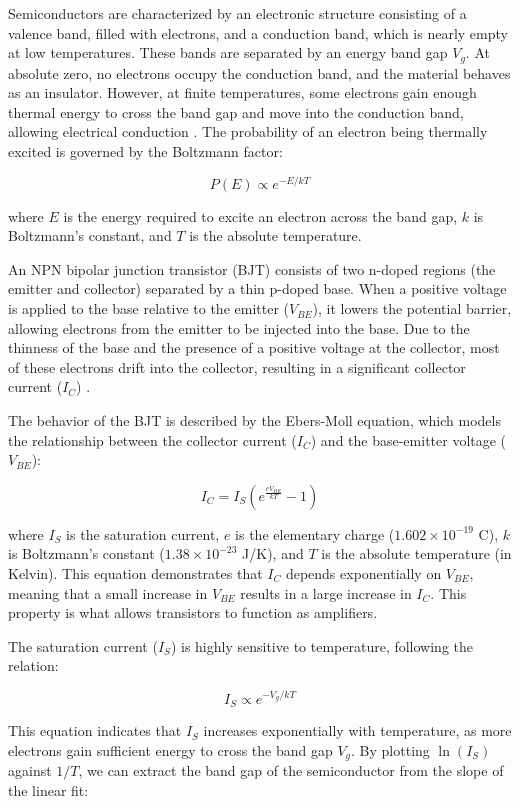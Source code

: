 \documentclass[12pt,letterpaper,onecolumn]{article}
\begin{document}
Semiconductors are characterized by an electronic structure consisting of a valence band, filled with electrons, and a conduction band, which is nearly empty at low temperatures. These bands are separated by an energy band gap \( V_g \). At absolute zero, no electrons occupy the conduction band, and the material behaves as an insulator. However, at finite temperatures, some electrons gain enough thermal energy to cross the band gap and move into the conduction band, allowing electrical conduction \cite{Thornton}. The probability of an electron being thermally excited is governed by the Boltzmann factor:

\[
P(E) \propto e^{-E/kT}
\]

where \( E \) is the energy required to excite an electron across the band gap, \( k \) is Boltzmann's constant, and \( T \) is the absolute temperature.

An NPN bipolar junction transistor (BJT) consists of two n-doped regions (the emitter and collector) separated by a thin p-doped base. When a positive voltage is applied to the base relative to the emitter (\( V_{BE} \)), it lowers the potential barrier, allowing electrons from the emitter to be injected into the base. Due to the thinness of the base and the presence of a positive voltage at the collector, most of these electrons drift into the collector, resulting in a significant collector current (\( I_C \)) \cite{Neudeck}.

The behavior of the BJT is described by the Ebers-Moll equation, which models the relationship between the collector current (\( I_C \)) and the base-emitter voltage (\( V_{BE} \)):

\[
I_C = I_S \left(e^{\frac{eV_{BE}}{kT}} - 1\right)
\]

where \( I_S \) is the saturation current, \( e \) is the elementary charge (\(1.602 \times 10^{-19}\) C), \( k \) is Boltzmann’s constant (\(1.38 \times 10^{-23}\) J/K), and \( T \) is the absolute temperature (in Kelvin). This equation demonstrates that \( I_C \) depends exponentially on \( V_{BE} \), meaning that a small increase in \( V_{BE} \) results in a large increase in \( I_C \). This property is what allows transistors to function as amplifiers.

The saturation current (\( I_S \)) is highly sensitive to temperature, following the relation:

\[
I_S \propto e^{-V_g/kT}
\]

This equation indicates that \( I_S \) increases exponentially with temperature, as more electrons gain sufficient energy to cross the band gap \( V_g \). By plotting \( \ln(I_S) \) against \( 1/T \), we can extract the band gap of the semiconductor from the slope of the linear fit:
\end{document}

